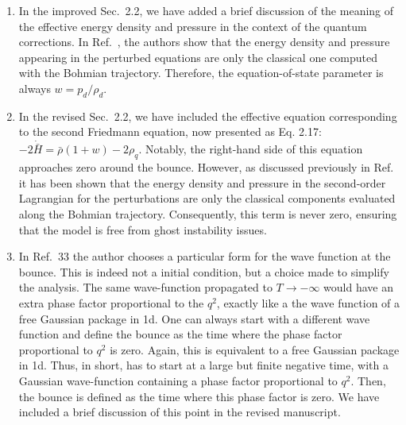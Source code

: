\documentclass[a4paper,11pt]{article}
\begin{document}
\begin{enumerate}
\begin{enumerate}
              \item In the improved Sec.~2.2, we have added a brief discussion of the
                    meaning of the effective energy density and pressure in the context
                    of the quantum corrections. In Ref.~\cite{fluidgeral}, the authors
                    show that the energy density and pressure appearing in the perturbed
                    equations are only the classical one computed with the Bohmian
                    trajectory. Therefore, the equation-of-state parameter is always
                    $w=p_d/\rho_d$.

              \item In the revised Sec.~2.2, we have included the effective equation
                    corresponding to the second Friedmann equation, now presented as Eq. 2.17:
                    $-2\dot{\bar{H}} = \bar{\rho}(1+w) - 2\rho_q.$
                    Notably, the right-hand side of this equation approaches zero around the
                    bounce. However, as discussed previously in Ref.~\cite{fluidgeral} it
                    has been shown that the energy density and pressure in the second-order
                    Lagrangian for the perturbations are only the classical components
                    evaluated along the Bohmian trajectory. Consequently, this term is never
                    zero, ensuring that the model is free from ghost instability issues.
              \item In Ref.~33 the author chooses a particular form for the wave
                    function at the bounce. This is indeed not a initial condition, but
                    a choice made to simplify the analysis. The same wave-function
                    propagated to $T\to-\infty$ would have an extra phase factor
                    proportional to the $q^2$, exactly like a the wave function of a
                    free Gaussian package in 1d. One can always start with a different
                    wave function and define the bounce as the time where the phase
                    factor proportional to $q^2$ is zero. Again, this is equivalent to a
                    free Gaussian package in 1d. Thus, in short, has to start at a large
                    but finite negative time, with a Gaussian wave-function containing a
                    phase factor proportional to $q^2$. Then, the bounce is defined as
                    the time where this phase factor is zero. We have included a brief
                    discussion of this point in the revised manuscript.

\end{enumerate}
\end{enumerate}
\end{document}
